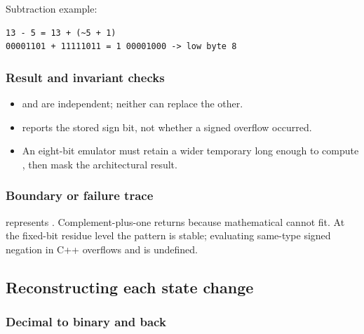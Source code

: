 Subtraction example:

\begin{verbatim}
13 - 5 = 13 + (~5 + 1)
00001101 + 11111011 = 1 00001000 -> low byte 8
\end{verbatim}

\subsubsection{Result and invariant checks}\label{appendix-92ff77d4dfdc-result-and-invariant-checks-1}

\hypertarget{appendix-92ff77d4dfdc-result-and-invariant-checks-1}{}

\begin{itemize}
\tightlist
\item
   and  are independent; neither can replace the other.
\item
   reports the stored sign bit, not whether a signed overflow occurred.
\item
  An eight-bit emulator must retain a wider temporary long enough to compute , then mask the architectural result.
\end{itemize}

\subsubsection{Boundary or failure trace}\label{appendix-92ff77d4dfdc-boundary-or-failure-trace-1}

\hypertarget{appendix-92ff77d4dfdc-boundary-or-failure-trace-1}{}

 represents . Complement-plus-one returns  because mathematical  cannot fit. At the fixed-bit residue level the pattern is stable; evaluating same-type signed negation in C++ overflows and is undefined.

\subsection{Reconstructing each state change}\label{appendix-92ff77d4dfdc-reconstructing-each-state-change}

\hypertarget{appendix-92ff77d4dfdc-reconstructing-each-state-change}{}

\subsubsection{Decimal to binary and back}\label{appendix-92ff77d4dfdc-decimal-to-binary-and-back}

